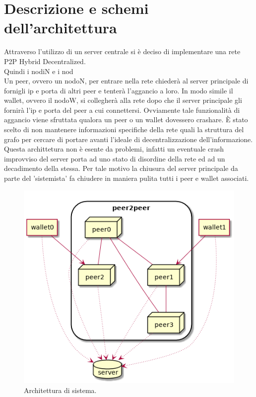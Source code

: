 \documentclass[a4paper,10pt]{report}
\begin{document}
  \chapter{Descrizione e schemi dell'architettura}
  Attraverso l'utilizzo di un server centrale si è deciso di implementare una rete P2P Hybrid Decentralized.
\\Quindi i nodiN e i nod
\\Un peer, ovvero un nodoN, per entrare nella rete chiederà al server principale di fornigli ip e porta di altri peer e tenterà l'aggancio a loro. In modo simile il wallet, ovvero il nodoW, si collegherà alla rete dopo che il server principale gli fornirà l'ip e porta del peer a cui connettersi. Ovviamente tale funzionalità di aggancio viene sfruttata qualora un peer o un wallet dovessero crashare.
È stato scelto di non mantenere informazioni specifiche della rete quali la struttura del grafo per cercare di portare avanti l'ideale di decentralizzazione dell'informazione. Questa archittetura non è esente da problemi, infatti un eventuale crash improvviso del server porta ad uno stato di disordine della rete ed ad un decadimento della stessa. Per tale motivo la chiusura del server principale da parte del 'sistemista' fa chiudere in maniera pulita tutti i peer e wallet associati.
  \begin{figure}[H]
  \center\includegraphics[scale=0.50]{arch.png}
  \caption{Architettura di sistema.}
  \end{figure}
  
\end{document}
